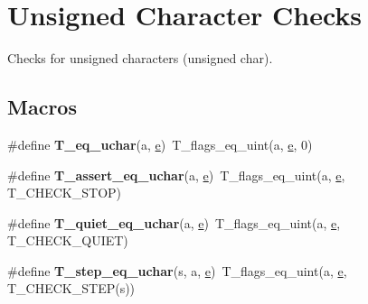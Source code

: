 \hypertarget{group__RTEMSTestFrameworkChecksUChar}{}\section{Unsigned Character Checks}
\label{group__RTEMSTestFrameworkChecksUChar}


Checks for unsigned characters (unsigned char).  


\subsection*{Macros}
\begin{DoxyCompactItemize}
\item 
\mbox{\label{group__RTEMSTestFrameworkChecksUChar_ga8b50622e693a737296403cc1de8052a6}} 
\#define {\bfseries T\+\_\+eq\+\_\+uchar}(a,  \mbox{\hyperlink{sun4u_2tte_8h_a8b0b9ed08e0e18920ec2682f48228c27}{e}})~T\+\_\+flags\+\_\+eq\+\_\+uint(a, \mbox{\hyperlink{sun4u_2tte_8h_a8b0b9ed08e0e18920ec2682f48228c27}{e}}, 0)
\item 
\mbox{\label{group__RTEMSTestFrameworkChecksUChar_ga4d11e9ef2001dbb015d6c2d414a043c1}} 
\#define {\bfseries T\+\_\+assert\+\_\+eq\+\_\+uchar}(a,  \mbox{\hyperlink{sun4u_2tte_8h_a8b0b9ed08e0e18920ec2682f48228c27}{e}})~T\+\_\+flags\+\_\+eq\+\_\+uint(a, \mbox{\hyperlink{sun4u_2tte_8h_a8b0b9ed08e0e18920ec2682f48228c27}{e}}, T\+\_\+\+C\+H\+E\+C\+K\+\_\+\+S\+T\+OP)
\item 
\mbox{\label{group__RTEMSTestFrameworkChecksUChar_ga4d91827631936eb5efff8fa9ccdc975b}} 
\#define {\bfseries T\+\_\+quiet\+\_\+eq\+\_\+uchar}(a,  \mbox{\hyperlink{sun4u_2tte_8h_a8b0b9ed08e0e18920ec2682f48228c27}{e}})~T\+\_\+flags\+\_\+eq\+\_\+uint(a, \mbox{\hyperlink{sun4u_2tte_8h_a8b0b9ed08e0e18920ec2682f48228c27}{e}}, T\+\_\+\+C\+H\+E\+C\+K\+\_\+\+Q\+U\+I\+ET)
\item 
\mbox{\label{group__RTEMSTestFrameworkChecksUChar_gabbd1aabc7eb82ac503bcafbf85334b2c}} 
\#define {\bfseries T\+\_\+step\+\_\+eq\+\_\+uchar}(s,  a,  \mbox{\hyperlink{sun4u_2tte_8h_a8b0b9ed08e0e18920ec2682f48228c27}{e}})~T\+\_\+flags\+\_\+eq\+\_\+uint(a, \mbox{\hyperlink{sun4u_2tte_8h_a8b0b9ed08e0e18920ec2682f48228c27}{e}}, T\+\_\+\+C\+H\+E\+C\+K\+\_\+\+S\+T\+EP(s))

\end{DoxyCompactItemize}
